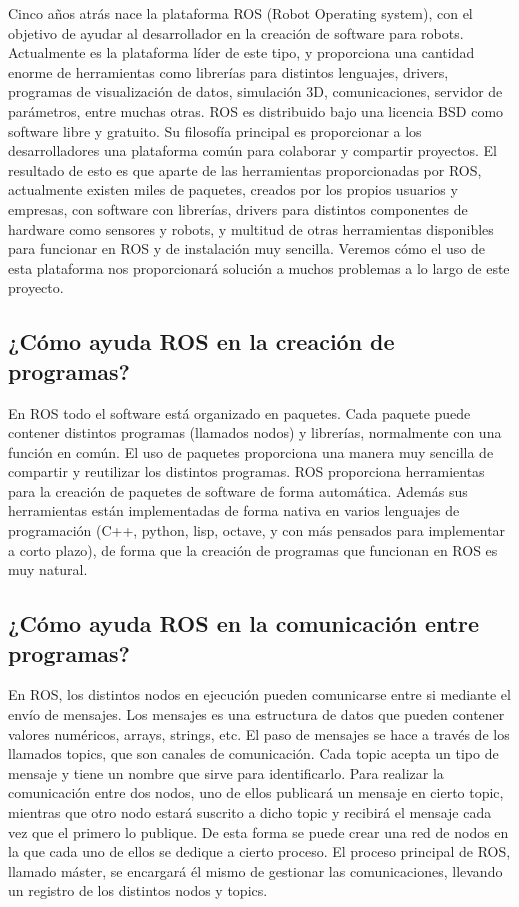 \documentclass[12pt,a4paper]{article}
\begin{document}
Cinco años atrás nace la plataforma ROS (Robot Operating system), con el objetivo de ayudar al desarrollador en la creación de software para robots. Actualmente es la plataforma líder de este tipo, y proporciona una cantidad enorme de herramientas como librerías para distintos lenguajes, drivers, programas de visualización de datos, simulación 3D, comunicaciones, servidor de parámetros, entre muchas otras. ROS es distribuido bajo una licencia BSD como software libre y gratuito. Su filosofía principal es proporcionar a los desarrolladores una plataforma común para colaborar y compartir proyectos. El resultado de esto es que aparte de las herramientas proporcionadas por ROS, actualmente existen miles de paquetes, creados por los propios usuarios y empresas, con software con librerías, drivers para distintos componentes de hardware como sensores y robots, y multitud de otras herramientas disponibles para funcionar en ROS y de instalación muy sencilla. Veremos cómo el uso de esta plataforma nos proporcionará solución a muchos problemas a lo largo de este proyecto.

\subsection{¿Cómo ayuda ROS en la creación de programas?}

En ROS todo el software está organizado en paquetes. Cada paquete puede contener distintos programas (llamados nodos) y librerías, normalmente con una función en común. El uso de paquetes proporciona una manera muy sencilla de compartir y reutilizar los distintos programas. ROS proporciona herramientas para la creación de paquetes de software de forma automática. Además sus herramientas están implementadas de forma nativa en varios lenguajes de programación (C++, python, lisp, octave, y con más pensados para implementar a corto plazo), de forma que la creación de programas que funcionan en ROS es muy natural.

\subsection{¿Cómo ayuda ROS en la comunicación entre programas?}

En ROS, los distintos nodos en ejecución pueden comunicarse entre si mediante el envío de mensajes. Los mensajes es una estructura de datos que pueden contener valores numéricos, arrays, strings, etc. El paso de mensajes se hace a través de los llamados topics, que son canales de comunicación. Cada topic acepta un tipo de mensaje y tiene un nombre que sirve para identificarlo. Para realizar la comunicación entre dos nodos, uno de ellos publicará un mensaje en cierto topic, mientras que otro nodo estará suscrito a dicho topic y recibirá el mensaje cada vez que el primero lo publique. De esta forma se puede crear una red de nodos en la que cada uno de ellos se dedique a cierto proceso. El proceso principal de ROS, llamado máster, se encargará él mismo de gestionar las comunicaciones, llevando un registro de los distintos nodos y topics.
\end{document}
